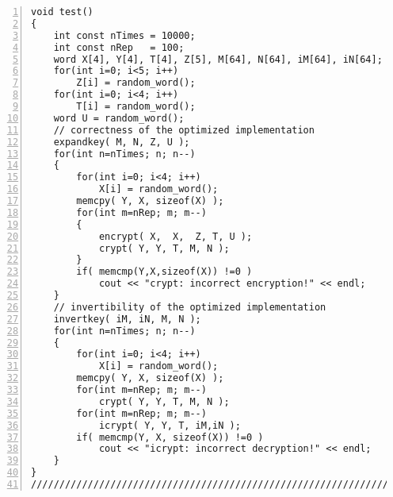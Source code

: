 \documentclass[a4paper,oneside,english]{amsart}
\numberwithin{equation}{section}
\numberwithin{figure}{section}
\begin{document}
\begin{lstlisting}[basicstyle={\scriptsize\ttfamily},numbers=left,tabsize=4]
void test()
{
    int const nTimes = 10000;
    int const nRep   = 100;
    word X[4], Y[4], T[4], Z[5], M[64], N[64], iM[64], iN[64];
    for(int i=0; i<5; i++)
        Z[i] = random_word();
    for(int i=0; i<4; i++)
        T[i] = random_word();
    word U = random_word();
    // correctness of the optimized implementation
    expandkey( M, N, Z, U );
    for(int n=nTimes; n; n--)
    {
        for(int i=0; i<4; i++)
            X[i] = random_word();
        memcpy( Y, X, sizeof(X) );
        for(int m=nRep; m; m--)
        {
            encrypt( X,  X,  Z, T, U );
            crypt( Y, Y, T, M, N );
        }
        if( memcmp(Y,X,sizeof(X)) !=0 )
            cout << "crypt: incorrect encryption!" << endl;
    }
    // invertibility of the optimized implementation
    invertkey( iM, iN, M, N );
    for(int n=nTimes; n; n--)
    {
        for(int i=0; i<4; i++)
            X[i] = random_word();
        memcpy( Y, X, sizeof(X) );
        for(int m=nRep; m; m--)
            crypt( Y, Y, T, M, N );
        for(int m=nRep; m; m--)
            icrypt( Y, Y, T, iM,iN );
        if( memcmp(Y, X, sizeof(X)) !=0 )
            cout << "icrypt: incorrect decryption!" << endl;
    }
}
////////////////////////////////////////////////////////////////////////
\end{lstlisting}
\end{document}
